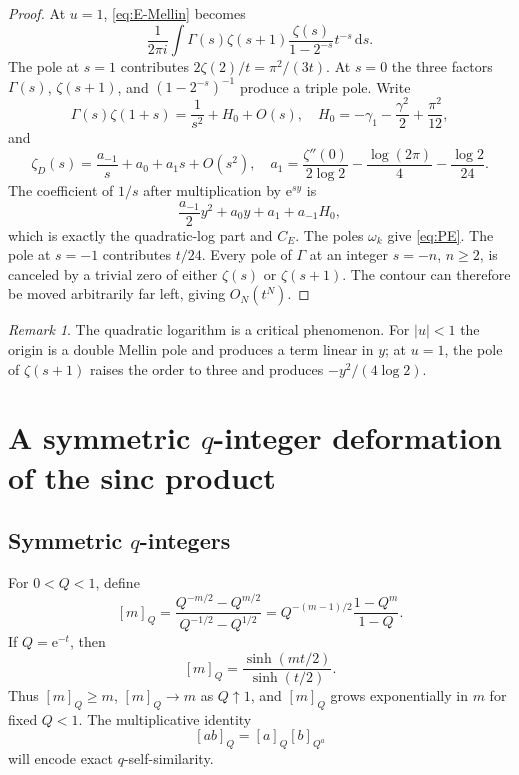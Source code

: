 \documentclass[11pt,oneside]{article}
\numberwithin{equation}{section}
\theoremstyle{plain}
\theoremstyle{definition}
\theoremstyle{remark}
\newtheorem{remark}[theorem]{Remark}
\newcommand{\dd}{\,\mathrm{d}}
\newcommand{\e}{\mathrm e}
\begin{document}
\begin{proof}
At $u=1$, \cref{eq:E-Mellin} becomes
\[
 \frac1{2\pi i}\int
 \Gamma(s)\zeta(s+1)\frac{\zeta(s)}{1-2^{-s}}t^{-s}\dd s.
\]
The pole at $s=1$ contributes $2\zeta(2)/t=\pi^2/(3t)$.  At $s=0$ the three factors $\Gamma(s)$, $\zeta(s+1)$, and $(1-2^{-s})^{-1}$ produce a triple pole.  Write
\[
 \Gamma(s)\zeta(1+s)
 =\frac1{s^2}+H_0+O(s),
 \quad
 H_0=-\gamma_1-\frac{\gamma^2}{2}+\frac{\pi^2}{12},
\]
and
\[
 \zeta_D(s)=\frac{a_{-1}}s+a_0+a_1s+O(s^2),
 \quad
 a_1=\frac{\zeta''(0)}{2\log2}
 -\frac{\log(2\pi)}4-\frac{\log2}{24}.
\]
The coefficient of $1/s$ after multiplication by $\e^{sy}$ is
\[
 \frac{a_{-1}}2y^2+a_0y+a_1+a_{-1}H_0,
\]
which is exactly the quadratic-log part and $C_E$.  The poles $\omega_k$ give \cref{eq:PE}.  The pole at $s=-1$ contributes $t/24$.  Every pole of $\Gamma$ at an integer $s=-n$, $n\ge2$, is canceled by a trivial zero of either $\zeta(s)$ or $\zeta(s+1)$.  The contour can therefore be moved arbitrarily far left, giving $O_N(t^N)$.
\end{proof}

\begin{remark}
The quadratic logarithm is a critical phenomenon.  For $|u|<1$ the origin is a double Mellin pole and produces a term linear in $y$; at $u=1$, the pole of $\zeta(s+1)$ raises the order to three and produces $-y^2/(4\log2)$.
\end{remark}

\section{A symmetric $q$-integer deformation of the sinc product}

\subsection{Symmetric $q$-integers}

For $0<Q<1$, define
\begin{equation}\label{eq:q-int}
 [m]_Q=\frac{Q^{-m/2}-Q^{m/2}}{Q^{-1/2}-Q^{1/2}}
 =Q^{-(m-1)/2}\frac{1-Q^m}{1-Q}.
\end{equation}
If $Q=\e^{-t}$, then
\begin{equation}\label{eq:q-int-sinh}
 [m]_Q=\frac{\sinh(mt/2)}{\sinh(t/2)}.
\end{equation}
Thus $[m]_Q\ge m$, $[m]_Q\to m$ as $Q\uparrow1$, and $[m]_Q$ grows exponentially in $m$ for fixed $Q<1$.  The multiplicative identity
\begin{equation}\label{eq:q-int-mult}
 [ab]_Q=[a]_Q[b]_{Q^a}
\end{equation}
will encode exact $q$-self-similarity.
\end{document}
